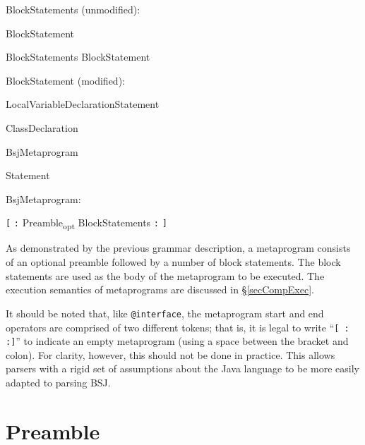\documentclass[a4paper,10pt]{report}
\newcommand{\refS}[1]{\hyperref[#1]{\S\ref{#1}}}
\newcommand{\opt}{\textsubscript{opt}}
\newenvironment{grammar}{
    \begin{list}{}{
        \itshape
        \setlength{\partopsep}{\topsep}
        \setlength{\topsep}{0cm}
    }
}{
    \end{list}
}
\begin{document}
\begin{grammar}
    \item BlockStatements (unmodified):
    \begin{grammar}
        \item BlockStatement
        \item BlockStatements BlockStatement
    \end{grammar}
\end{grammar}

\begin{grammar}
    \item BlockStatement (modified):
    \begin{grammar}
        \item LocalVariableDeclarationStatement
        \item ClassDeclaration
        \item BsjMetaprogram
        \item Statement
    \end{grammar}
\end{grammar}

\begin{grammar}
    \item BsjMetaprogram:
    \begin{grammar}
        \item \verb`[` \verb`:` Preamble\opt{} BlockStatements \verb`:` \verb`]`
    \end{grammar}
\end{grammar}

As demonstrated by the previous grammar description, a metaprogram consists of an optional preamble followed by a number of block statements.  The block statements are used as the body of the metaprogram to be executed.  The execution semantics of metaprograms are discussed in \refS{secCompExec}.

It should be noted that, like \verb`@interface`, the metaprogram start and end operators are comprised of two different tokens; that is, it is legal to write ``\verb`[ : :]`'' to indicate an empty metaprogram (using a space between the bracket and colon).  For clarity, however, this should not be done in practice.  This allows parsers with a rigid set of assumptions about the Java language to be more easily adapted to parsing BSJ.

\section{Preamble}
\label{secMetaprogPreamble}
\end{document}
